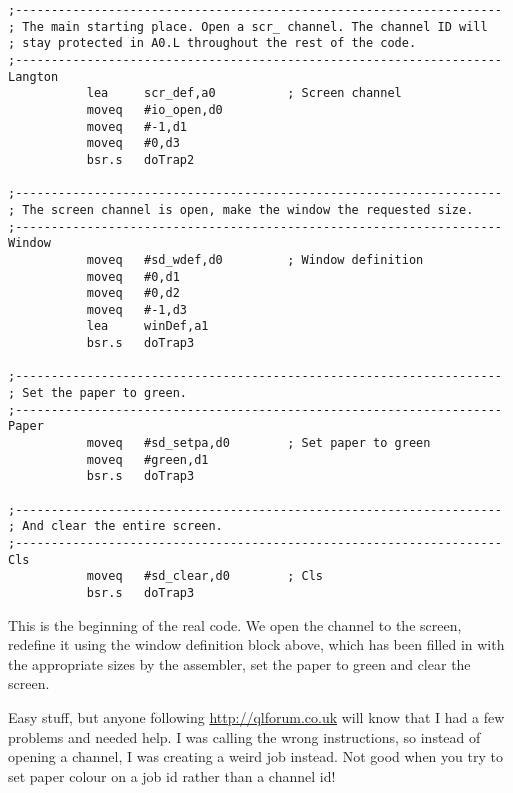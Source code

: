 \begin{lstlisting}[firstnumber=last,caption={Langtons Ant - Start Here}]
;--------------------------------------------------------------------
; The main starting place. Open a scr_ channel. The channel ID will
; stay protected in A0.L throughout the rest of the code.
;--------------------------------------------------------------------
Langton
           lea     scr_def,a0          ; Screen channel
           moveq   #io_open,d0
           moveq   #-1,d1
           moveq   #0,d3
           bsr.s   doTrap2

;--------------------------------------------------------------------
; The screen channel is open, make the window the requested size.
;--------------------------------------------------------------------
Window
           moveq   #sd_wdef,d0         ; Window definition
           moveq   #0,d1
           moveq   #0,d2
           moveq   #-1,d3
           lea     winDef,a1
           bsr.s   doTrap3

;--------------------------------------------------------------------
; Set the paper to green.
;--------------------------------------------------------------------
Paper
           moveq   #sd_setpa,d0        ; Set paper to green
           moveq   #green,d1
           bsr.s   doTrap3

;--------------------------------------------------------------------
; And clear the entire screen.
;--------------------------------------------------------------------
Cls
           moveq   #sd_clear,d0        ; Cls
           bsr.s   doTrap3

\end{lstlisting}

This is the beginning of the real code. We open the channel to the screen, redefine it using the window definition block above, which has been filled in with the appropriate sizes by the assembler, set the paper to green and clear the screen.

Easy stuff, but anyone following \href{http://qlforum.co.uk}{http://qlforum.co.uk} will know that I had a few problems and needed help. I was calling the wrong  instructions, so instead of opening a channel, I was creating a weird job instead. Not good when you try to set paper colour on a job id rather than a channel id!

